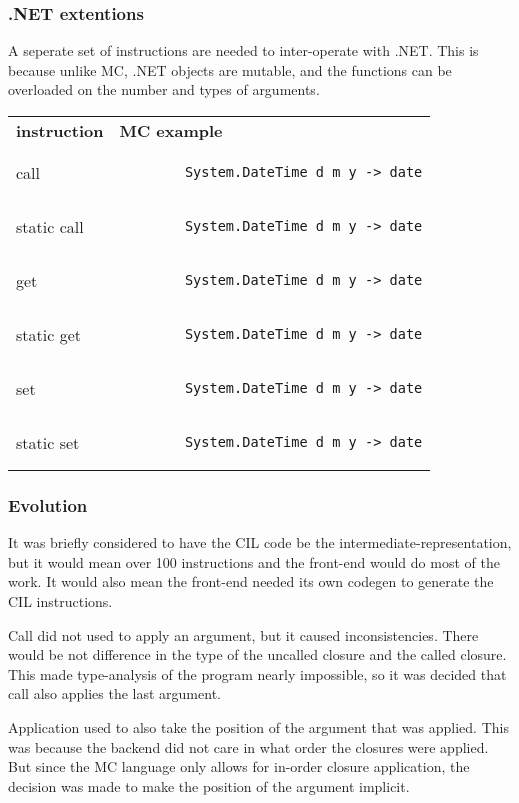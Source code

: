 \subsubsection{.NET extentions}
A seperate set of instructions are needed to inter-operate with .NET.
This is because unlike MC, .NET objects are mutable, and the functions can be overloaded on the number and types of arguments.

\begin{tabular}{ll}
    \textbf{instruction} & \textbf{MC example}\\
    call & \begin{lstlisting}
        System.DateTime d m y -> date
    \end{lstlisting}\\
    static call & \begin{lstlisting}
        System.DateTime d m y -> date
    \end{lstlisting}\\
    get & \begin{lstlisting}
        System.DateTime d m y -> date
    \end{lstlisting}\\
    static get & \begin{lstlisting}
        System.DateTime d m y -> date
    \end{lstlisting}\\
    set & \begin{lstlisting}
        System.DateTime d m y -> date
    \end{lstlisting}\\
    static set & \begin{lstlisting}
        System.DateTime d m y -> date
    \end{lstlisting}\\
\end{tabular}

\subsubsection{Evolution}
It was briefly considered to have the CIL code be the intermediate-representation, but it would mean over 100 instructions and the front-end would do most of the work.
It would also mean the front-end needed its own codegen to generate the CIL instructions.

Call did not used to apply an argument, but it caused inconsistencies.
There would be not difference in the type of the uncalled closure and the called closure.
This made type-analysis of the program nearly impossible, so it was decided that call also applies the last argument.

Application used to also take the position of the argument that was applied.
This was because the backend did not care in what order the closures were applied.
But since the MC language only allows for in-order closure application, the decision was made to make the position of the argument implicit.

